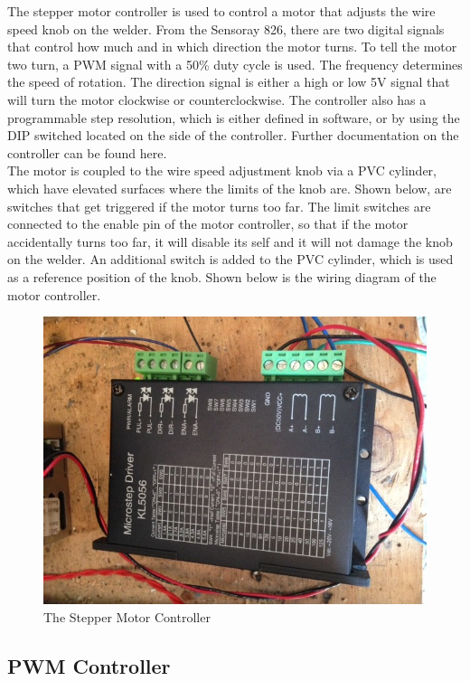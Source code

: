 \documentclass[12pt]{article}
\newlength\tindent
\renewcommand{\indent}{\hspace*{\tindent}}
\begin{document}
\indent The stepper motor controller is used to control a motor that adjusts the wire speed knob on the welder. From the Sensoray 826, there are two digital signals that control how much and in which direction the motor turns. To tell the motor two turn, a PWM signal with a 50\% duty cycle is used. The frequency determines the speed of rotation. The direction signal is either a high or low 5V signal that will turn the motor clockwise or counterclockwise. The controller also has a programmable step resolution, which is either defined in software, or by using the DIP switched located on the side of the controller. Further documentation on the controller can be found here. \\
\indent The motor is coupled to the wire speed adjustment knob via a PVC cylinder, which have elevated surfaces where the limits of the knob are. Shown below, are switches that get triggered if the motor turns too far. The limit switches are connected to the enable pin of the motor controller, so that if the motor accidentally turns too far, it will disable its self and it will not damage the knob on the welder. An additional switch is added to the PVC cylinder, which is used as a reference position of the knob. Shown below is the wiring diagram of the motor controller.


\begin{figure}[!h]
\centering
\includegraphics[scale=0.55]{stepper}
\caption{The Stepper Motor Controller}
\end{figure}


\clearpage
\subsection{PWM Controller}
\end{document}
